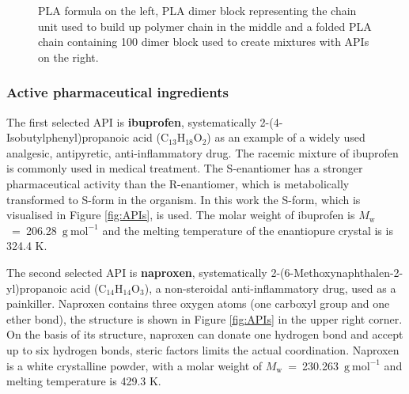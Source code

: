 \begin{figure}[htb]
\begin{subfigure}{0.33\textwidth}
	\end{subfigure}
	\caption{PLA formula on the left, PLA dimer block representing the chain unit used to build up polymer chain in the middle and a folded PLA chain containing 100 dimer block used to create mixtures with APIs on the right.}
	\vspace{-0.5cm}
	\label{fig:pla}
\end{figure}

\subsubsection{Active pharmaceutical ingredients}

The first selected API is \textbf{ibuprofen}, systematically 2-(4-Isobutylphenyl)propanoic acid (C$_{13}$H$_{18}$O$_{2}$) as an example of a widely used analgesic, antipyretic, anti-inflammatory drug. The racemic mixture of ibuprofen is commonly used in medical treatment. The S-enantiomer has a stronger pharmaceutical activity than the R-enantiomer, which is metabolically transformed to S-form in the organism. \cite{rainsford_ibuprofen_2009} In this work the S-form, which is visualised in Figure \ref{fig:APIs}, is used. The molar weight of ibuprofen is $M_\mathrm{w}$~=~206.28~$\mathrm{g\ mol^{-1}}$ and the melting temperature of the enantiopure crystal is is 324.4 K. \cite{stejfa_heat_2021} 

The second selected API is \textbf{naproxen}, systematically 2-(6-Methoxynaphthalen-2-yl)propanoic acid (C$_{14}$H$_{14}$O$_{3}$), a non-steroidal anti-inflammatory drug, used as a painkiller. Naproxen contains three oxygen atoms (one carboxyl group and one ether bond), the structure is shown in Figure \ref{fig:APIs} in the upper right corner. On the basis of its structure, naproxen can donate one hydrogen bond and accept up to six hydrogen bonds, steric factors limits the actual coordination. Naproxen is a white crystalline powder, with a molar weight of $M_\mathrm{w}$~=~230.263~$\mathrm{g\ mol^{-1}}$ and melting temperature is 429.3 K. \cite{stejfa_heat_2021}

